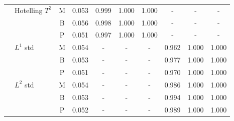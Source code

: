 \begin{tabular*}{\textwidth}{@{\extracolsep\fill}
l
>{\raggedright\arraybackslash}p{3.2cm}
c
*{7}{S[table-format=1.3]}
@{}}
\midrule
 & Hotelling $T^{2}$ & M & 0.053 & 0.999 & 1.000 & 1.000 & - & - & - \\
 &  & B & 0.056 & 0.998 & 1.000 & 1.000 & - & - & - \\
 &  & P & 0.051 & 0.997 & 1.000 & 1.000 & - & - & - \\
 & $L^{1}$ std & M & 0.054 & - & - & - & 0.962 & 1.000 & 1.000 \\
 &  & B & 0.053 & - & - & - & 0.977 & 1.000 & 1.000 \\
 &  & P & 0.051 & - & - & - & 0.970 & 1.000 & 1.000 \\
 & $L^{2}$ std & M & 0.054 & - & - & - & 0.986 & 1.000 & 1.000 \\
 &  & B & 0.053 & - & - & - & 0.994 & 1.000 & 1.000 \\
 &  & P & 0.052 & - & - & - & 0.989 & 1.000 & 1.000 \\
\bottomrule
\end{tabular*}
